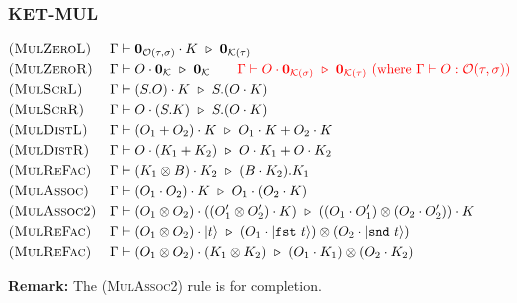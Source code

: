 \subsubsection*{\textsf{KET-MUL}}
\begin{align*}
  & \textsc{(MulZeroL)} && \Gamma \vdash \mathbf{0}_{\mathcal{O}(\tau, \sigma)} \cdot K \ \triangleright\  \mathbf{0}_{\mathcal{K}(\tau)} \\
  & \textsc{(MulZeroR)} && 
  \Gamma \vdash O \cdot \mathbf{0}_{\mathcal{K}} \ \triangleright\  \mathbf{0}_{\mathcal{K}}
  \qquad
  \textcolor{red}{{\Gamma \vdash O \cdot \mathbf{0}_{\mathcal{K}(\sigma)} \ \triangleright\  \mathbf{0}_{\mathcal{K}(\tau)}}\ \textrm{(where $\Gamma \vdash O : \mathcal{O}(\tau, \sigma)$)}} \\
  & \textsc{(MulScrL)} && \Gamma \vdash (S.O) \cdot K \ \triangleright\  S.(O \cdot K) \\
  & \textsc{(MulScrR)} && \Gamma \vdash O \cdot (S.K) \ \triangleright\  S.(O \cdot K) \\
  & \textsc{(MulDistL)} && \Gamma \vdash (O_1 + O_2) \cdot K \ \triangleright\  O_1 \cdot K + O_2 \cdot K \\
  & \textsc{(MulDistR)} && \Gamma \vdash O \cdot (K_1 + K_2) \ \triangleright\  O \cdot K_1 + O \cdot K_2 \\
  & \textsc{(MulReFac)} && \Gamma \vdash (K_1 \otimes B) \cdot K_2 \ \triangleright\  (B \cdot K_2).K_1 \\
  & \textsc{(MulAssoc)} && \Gamma \vdash (O_1 \cdot O_2) \cdot K \ \triangleright\  O_1 \cdot (O_2 \cdot K) \\
  & \textsc{(MulAssoc2)} && \Gamma \vdash (O_1 \otimes O_2) \cdot ((O_1' \otimes O_2') \cdot K) \ \triangleright\  ((O_1 \cdot O_1') \otimes (O_2 \cdot O_2')) \cdot K \\
  & \textsc{(MulReFac)} && \Gamma \vdash (O_1 \otimes O_2) \cdot |t\rangle \ \triangleright\  (O_1 \cdot |\texttt{fst}\ t\rangle) \otimes (O_2 \cdot |\texttt{snd}\ t\rangle) \\
  & \textsc{(MulReFac)} && \Gamma \vdash (O_1 \otimes O_2) \cdot (K_1 \otimes K_2) \ \triangleright\  (O_1 \cdot K_1) \otimes (O_2 \cdot K_2) \\
\end{align*}

\textbf{Remark:} The \textsc{(MulAssoc2)} rule is for completion.

